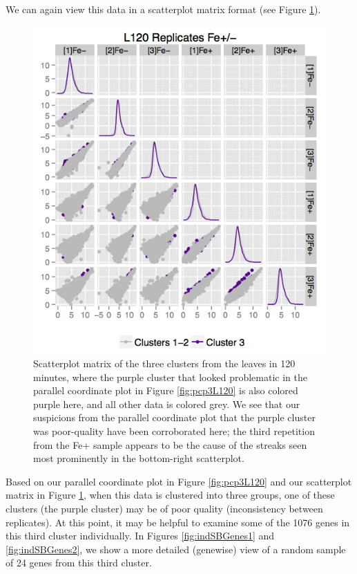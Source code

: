 \documentclass[11pt,a4paper,oldfontcommands,openany]{memoir}
\numberwithin{equation}{section} %
\begin{document}
We can again view this data in a scatterplot matrix format (see Figure \ref{fig:3scatterL120}).

\begin{figure}[H]
  \begin{framed}
  \centering
  \includegraphics[width=\textwidth]{3scatterL120}
  \end{framed}
  \caption{Scatterplot matrix of the three clusters from the leaves in 120 minutes, where the purple cluster that looked problematic in the parallel coordinate plot in Figure \ref{fig:pcp3L120} is also colored purple here, and all other data is colored grey. We see that our suspicions from the parallel coordinate plot that the purple cluster was poor-quality have been corroborated here; the third repetition from the Fe+ sample appears to be the cause of the streaks seen most prominently in the bottom-right scatterplot.}
  \label{fig:3scatterL120}
\end{figure}

Based on our parallel coordinate plot in Figure \ref{fig:pcp3L120} and our scatterplot matrix in Figure \ref{fig:3scatterL120}, when this data is clustered into three groups, one of these clusters (the purple cluster) may be of poor quality (inconsistency between replicates). At this point, it may be helpful to examine some of the 1076 genes in this third cluster individually. In Figures \ref{fig:indSBGenes1} and \ref{fig:indSBGenes2}, we show a more detailed (genewise) view of a random sample of 24 genes from this third cluster.
\end{document}
